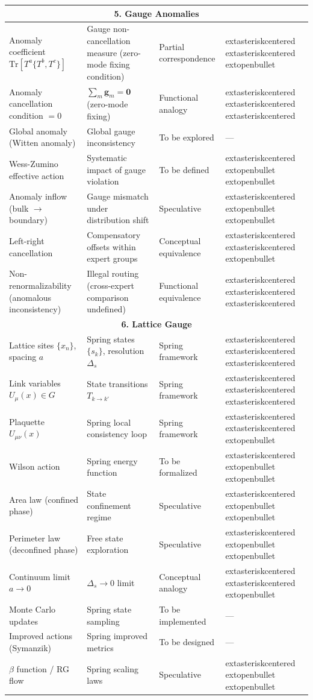 \documentclass[12pt,a4paper]{article}
\theoremstyle{remark}
\newcommand{\Tr}{\mathrm{Tr}}
\newcommand{\gaugeparam}{\mathbf{g}}
\begin{document}
\begin{longtable}{p{4.2cm} p{5cm} p{4cm} p{2cm}}
\midrule
\multicolumn{4}{c}{\textbf{5. Gauge Anomalies}} \\
\midrule
Anomaly coefficient $\Tr[T^a\{T^b,T^c\}]$ & Gauge non-cancellation measure (zero-mode fixing condition) & Partial correspondence & 	extasteriskcentered	extasteriskcentered	extopenbullet \\
Anomaly cancellation condition $= 0$ & $\sum_m \gaugeparam_m = \mathbf{0}$ (zero-mode fixing) & Functional analogy & 	extasteriskcentered	extasteriskcentered	extasteriskcentered \\
Global anomaly (Witten anomaly) & Global gauge inconsistency & To be explored & — \\
Wess-Zumino effective action & Systematic impact of gauge violation & To be defined & 	extasteriskcentered	extopenbullet	extopenbullet \\
Anomaly inflow (bulk $\to$ boundary) & Gauge mismatch under distribution shift & Speculative & 	extasteriskcentered	extopenbullet	extopenbullet \\
Left-right cancellation & Compensatory offsets within expert groups & Conceptual equivalence & 	extasteriskcentered	extasteriskcentered	extopenbullet \\
Non-renormalizability (anomalous inconsistency) & Illegal routing (cross-expert comparison undefined) & Functional equivalence & 	extasteriskcentered	extasteriskcentered	extasteriskcentered \\

\midrule
\multicolumn{4}{c}{\textbf{6. Lattice Gauge}} \\
\midrule
Lattice sites $\{x_n\}$, spacing $a$ & Spring states $\{s_k\}$, resolution $\Delta_s$ & Spring framework & 	extasteriskcentered	extasteriskcentered	extasteriskcentered \\
Link variables $U_\mu(x) \in G$ & State transitions $T_{k\to k'}$ & Spring framework & 	extasteriskcentered	extasteriskcentered	extasteriskcentered \\
Plaquette $U_{\mu\nu}(x)$ & Spring local consistency loop & Spring framework & 	extasteriskcentered	extasteriskcentered	extopenbullet \\
Wilson action & Spring energy function & To be formalized & 	extasteriskcentered	extopenbullet	extopenbullet \\
Area law (confined phase) & State confinement regime & Speculative & 	extasteriskcentered	extopenbullet	extopenbullet \\
Perimeter law (deconfined phase) & Free state exploration & Speculative & 	extasteriskcentered	extopenbullet	extopenbullet \\
Continuum limit $a \to 0$ & $\Delta_s \to 0$ limit & Conceptual analogy & 	extasteriskcentered	extasteriskcentered	extopenbullet \\
Monte Carlo updates & Spring state sampling & To be implemented & — \\
Improved actions (Symanzik) & Spring improved metrics & To be designed & — \\
$\beta$ function / RG flow & Spring scaling laws & Speculative & 	extasteriskcentered	extopenbullet	extopenbullet \\


\end{longtable}
\end{document}
